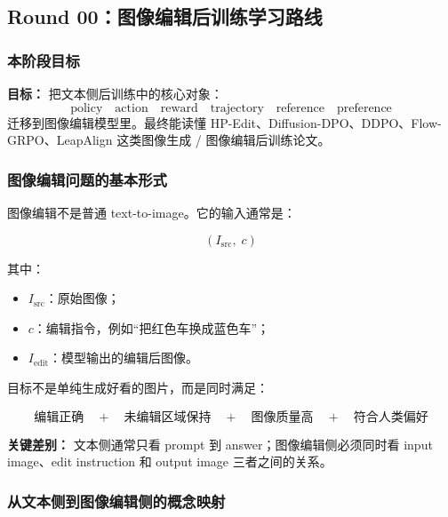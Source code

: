 
\subsection{Round 00：图像编辑后训练学习路线}

\subsubsection{本阶段目标}

\begin{conceptbox}
\textbf{目标：} 把文本侧后训练中的核心对象：
\[
\text{policy}
\quad
\text{action}
\quad
\text{reward}
\quad
\text{trajectory}
\quad
\text{reference}
\quad
\text{preference}
\]
迁移到图像编辑模型里。最终能读懂 HP-Edit、Diffusion-DPO、DDPO、Flow-GRPO、LeapAlign 这类图像生成 / 图像编辑后训练论文。
\end{conceptbox}

\subsubsection{图像编辑问题的基本形式}

图像编辑不是普通 text-to-image。它的输入通常是：

\[
(I_\text{src},\; c)
\]

其中：

\begin{itemize}[leftmargin=1.5em]
  \item $I_\text{src}$：原始图像；
  \item $c$：编辑指令，例如“把红色车换成蓝色车”；
  \item $I_\text{edit}$：模型输出的编辑后图像。
\end{itemize}

目标不是单纯生成好看的图片，而是同时满足：

\[
\text{编辑正确}
\quad
+
\quad
\text{未编辑区域保持}
\quad
+
\quad
\text{图像质量高}
\quad
+
\quad
\text{符合人类偏好}
\]

\begin{warnbox}
\textbf{关键差别：} 文本侧通常只看 prompt 到 answer；图像编辑侧必须同时看 input image、edit instruction 和 output image 三者之间的关系。
\end{warnbox}

\subsubsection{从文本侧到图像编辑侧的概念映射}

